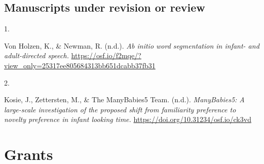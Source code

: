 \documentclass[10pt,a4paper,]{article}
\newlength{\cslhangindent}
\newlength{\csllabelwidth}
\newcommand{\CSLLeftMargin}[1]{\parbox[t]{\csllabelwidth}{\hfill #1~}}
\newcommand{\CSLRightInline}[1]{\parbox[t]{\linewidth - \cslhangindent - \csllabelwidth}{#1}\vspace{0.8ex}}
\begin{document}
\hypertarget{manuscripts-under-revision-or-review}{%
\subsection{Manuscripts under revision or
review}\label{manuscripts-under-revision-or-review}}

\hypertarget{bibliography}{}
\leavevmode{}%
\CSLLeftMargin{1. }%
\CSLRightInline{Von Holzen, K., \& Newman, R. (n.d.). \emph{Ab initio
word segmentation in infant- and adult-directed speech.}
\url{https://osf.io/f2mqe/?view_only=25317ee805684313bb651dcabb37fb31}}

\leavevmode{}%
\CSLLeftMargin{2. }%
\CSLRightInline{Kosie, J., Zettersten, M., \& The ManyBabies5 Team.
(n.d.). \emph{ManyBabies5: A large-scale investigation of the proposed
shift from familiarity preference to novelty preference in infant
looking time.} \url{https://doi.org/10.31234/osf.io/ck3vd}}

\pagebreak

\hypertarget{grants}{%
\section{Grants}\label{grants}}
\end{document}
